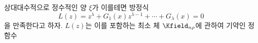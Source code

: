 
상대대수적으로 정수적인 양 $\xi$가 이를테면 방정식
\[
L(z)=z^\lambda+G_1(x)z^{\lambda-1}+\cdots+G_\lambda(x)=0
\]
을 만족한다고 하자. $L(z)$는 이를 포함하는 최소 체 $\Kfield_{n\rho}$에 관하여 기약인 정함수
